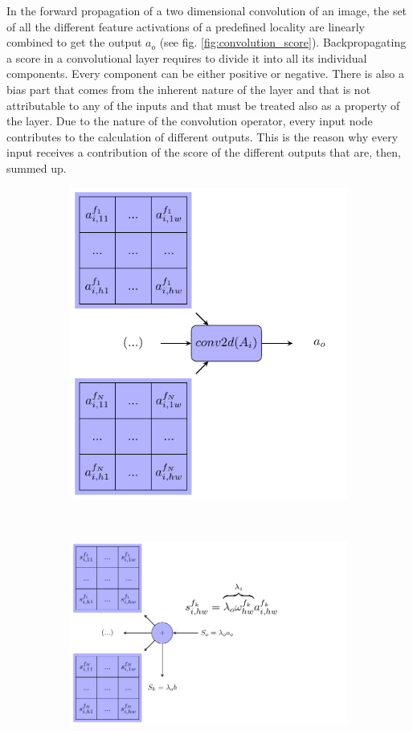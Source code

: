 \documentclass[review]{elsarticle}
\theoremstyle{definition} %
\theoremstyle{remark}
\begin{document}
In the forward propagation of a two dimensional convolution of an image, the set of all the different feature activations of a predefined locality are linearly combined to get the output $a_o$ (see fig. \ref{fig:convolution_score}). Backpropagating a score in a convolutional layer requires to divide it into all its individual components. Every component can be either positive or negative. There is also a bias part that comes from the inherent nature of the layer and that is not attributable to any of the inputs and that must be treated also as a property of the layer. Due to the nature of the convolution operator, every input node contributes to the calculation of different outputs. This is the reason why every input receives a contribution of the score of the different outputs that are, then, summed up.

\begin{figure}[!ht]
	\centering
	\begin{subfigure}{0.48\textwidth}
		\includegraphics[scale=0.55]{./figures/score_conv2d.pdf}
	\end{subfigure}
	~ %
	\begin{subfigure}{0.48\textwidth}
		\includegraphics[scale=0.55]{./figures/score_conv2d_score.pdf}

\end{subfigure}
\end{figure}
\end{document}
